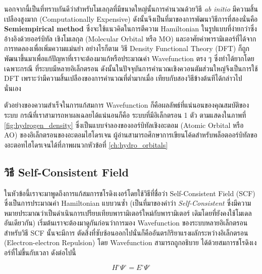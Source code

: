 นอกจากนี้เป็นที่ทราบกันดีว่าสำหรับโมเลกุลที่มีขนาดใหญ่นั้นการคำนวณด้วยวิธี \textit{ab initio} มีความสิ้นเปลืองสูงมาก (Computationally
Expensive)\autocite{grabowski2011} ดังนั้นจึงเป็นที่มาของการพัฒนาวิธีการที่สองนั่นคือ \textbf{Semiempirical method}%
\autocite{thiel2014,christensen2016,kriz2020} ซึ่งจะใช้แนวคิดในการตีความ Hamiltonian ในรูปแบบที่ง่ายกว่าซึ่งอ้างอิงด้วยออร์บิทัล%
เชิงโมเลกุล (Molecular Orbital หรือ MO) และอาศัยค่าพารามิเตอร์ที่ได้จากการทดลองเพื่อเพิ่มความแม่นยำ อย่างไรก็ตาม วิธี Density
Functional Theory (DFT) ก็ถูกพัฒนาขึ้นมาเพื่อแก้ปัญหาที่เราจะต้องมาแก้หรือประมาณค่า Wavefunction ตรง ๆ ซึ่งทำได้ยากโดยเฉพาะกรณี%
ที่ระบบมีหลายอิเล็กตรอน ดังนั้นในปัจจุบันการคำนวณเชิงควอนตัมส่วนใหญ่จึงเป็นการใช้ DFT เพราะว่ามีความสิ้นเปลืองของการคำนวณที่ต่ำมากเมื่อ%
เทียบกับสองวิธีข้างต้นทีได้กล่าวไปนั่นเอง

ตัวอย่างของความสำเร็จในการแก้สมการ Wavefunction ก็คือผลลัพธ์ที่แน่นอนของคุณสมบัติของระบบ กรณีที่เราสามารถหาผลเฉลยได้แน่นอนก็คือ%
ระบบที่มีอิเล็กตรอน 1 ตัว ตามแสดงในภาพที่ \ref{fig:hydrogen_density} ซึ่งเป็นแบบจำลองของออร์บิทัลเชิงอะตอม (Atomic Orbital
หรือ AO) ของอิเล็กตรอนของอะตอมไฮโดรเจน ผู้อ่านสามารถศึกษาการเขียนโค้ดสำหรับพล็อตออร์บิทัลของอะตอทไฮโดรเจนได้ที่ภาพผนวกหัวข้อที่
\ref{ch:hydro_orbitals}

\subsection{วิธี Self-Consistent Field}
\label{ssec:scf}

ในหัวข้อนี้เราจะมาพูดถึงการแก้สมการชโรดิงเงอร์โดยใช้วิธีที่ชื่อว่า Self-Consistent Field (SCF) ซึ่งเป็นการประมาณค่า Hamiltonian
แบบวนซ้ำ (เป็นที่มาของคำว่า \textit{Self-Consistent} ซึ่งมีความหมายประมาณว่าเป็นดำเนินการเปรียบเทียบพารามิเตอร์ใหม่กับพารามิเตอร์%
เดิมโดยที่ยังคงใช้โมเดลอันเดียวกัน) เริ่มต้นเราจะต้องมาดูกันก่อนว่าการมอง Wavefunction ของระบบหลายอิเล็กตรอนสำหรับวิธี SCF นั้นจะมีการ%
ตัดสิ่งที่ซับซ้อนออกไปนั่นก็คืออันตรกิริยาแรงผลักระหว่างอิเล็กตรอน (Electron-electron Repulsion) โดย Wavefunction สามารถถูกอธิบาย%
ได้ด้วยสมการชโรดิงเงอร์ที่ไม่ขึ้นกับเวลา ดังต่อไปนี้\autocite{cramer2004}

\begin{equation}\label{eq:tise_elec}
    H^{\circ} \Psi^{\circ} = E^{\circ} \Psi^{\circ}
\end{equation}

